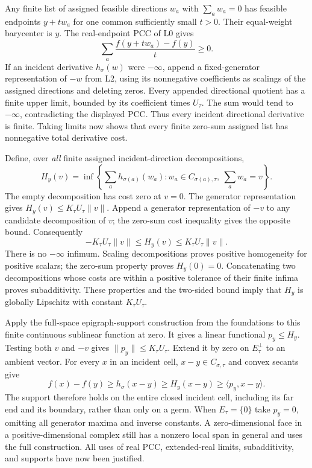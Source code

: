 \documentclass[
  11pt,
]{article}
\begin{document}
Any finite list of assigned feasible directions \(w_a\) with
\(\sum_a w_a=0\) has feasible endpoints \(y+t w_a\) for one common
sufficiently small \(t>0\). Their equal-weight barycenter is \(y\). The
real-endpoint PCC of L0 gives \[ \sum_a\frac{f(y+t w_a)-f(y)}t\geq0. \]
If an incident derivative \(h_\sigma(w)\) were \(-\infty\), append a
fixed-generator representation of \(-w\) from L2, using its nonnegative
coefficients as scalings of the assigned directions and deleting zeros.
Every appended directional quotient has a finite upper limit, bounded by
its coefficient times \(U_\tau\). The sum would tend to \(-\infty\),
contradicting the displayed PCC. Thus every incident directional
derivative is finite. Taking limits now shows that every finite zero-sum
assigned list has nonnegative total derivative cost.

Define, over \emph{all} finite assigned incident-direction
decompositions, \[
H_y(v)=\inf\left\{\sum_a h_{\sigma(a)}(w_a):
w_a\in C_{\sigma(a),\tau},\ \sum_a w_a=v\right\}.
\] The empty decomposition has cost zero at \(v=0\). The generator
representation gives \(H_y(v)\leq K_\tau U_\tau\|v\|\). Append a
generator representation of \(-v\) to any candidate decomposition of
\(v\); the zero-sum cost inequality gives the opposite bound.
Consequently
\[ -K_\tau U_\tau\|v\|\leq H_y(v)\leq K_\tau U_\tau\|v\|. \] There is no
\(-\infty\) infimum. Scaling decompositions proves positive homogeneity
for positive scalars; the zero-sum property proves \(H_y(0)=0\).
Concatenating two decompositions whose costs are within a positive
tolerance of their finite infima proves subadditivity. These properties
and the two-sided bound imply that \(H_y\) is globally Lipschitz with
constant \(K_\tau U_\tau\).

Apply the full-space epigraph-support construction from the foundations
to this finite continuous sublinear function at zero. It gives a linear
functional \(p_y\leq H_y\). Testing both \(v\) and \(-v\) gives
\(\|p_y\|\leq K_\tau U_\tau\). Extend it by zero on \(E_\tau^\perp\) to
an ambient vector. For every \(x\) in an incident cell,
\(x-y\in C_{\sigma,\tau}\) and convex secants give \[
f(x)-f(y)\geq h_\sigma(x-y)\geq H_y(x-y)\geq\langle p_y,x-y\rangle.
\] The support therefore holds on the entire closed incident cell,
including its far end and its boundary, rather than only on a germ. When
\(E_\tau=\{0\}\) take \(p_y=0\), omitting all generator maxima and
inverse constants. A zero-dimensional face in a positive-dimensional
complex still has a nonzero local span in general and uses the full
construction. All uses of real PCC, extended-real limits, subadditivity,
and supports have now been justified.
\end{document}
